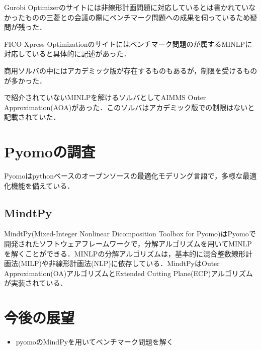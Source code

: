 \documentclass[twocolumn]{jarticle}
\begin{document}
    Gurobi Optimizer\cite{gurobi}のサイトには非線形計画問題に対応しているとは書かれていなかったものの三菱との会議の際にベンチマーク問題への成果を伺っているため疑問が残った．

    FICO Xpress Optimization\cite{fico}のサイトにはベンチマーク問題のが属するMINLPに対応していると具体的に記述があった．

    商用ソルバの中にはアカデミック版が存在するものもあるが，制限を受けるものが多かった．
    
    \cite{40021875158}で紹介されていないMINLPを解けるソルバとしてAIMMS Outer Approximation(AOA)\cite{AOA}があった．このソルバはアカデミック版での制限はないと記載されていた．

\section{Pyomoの調査}
    Pyomo\cite{bynum2021pyomo}\cite{hart2011pyomo}はpythonベースのオープンソースの最適化モデリング言語で，多様な最適化機能を備えている．
    \subsection{MindtPy}
        MindtPy(Mixed-Integer Nonlinear Dicomposition Toolbox for Pyomo)\cite{BERNAL2018895}はPyomoで開発されたソフトウェアフレームワークで，分解アルゴリズムを用いてMINLPを解くことができる．MINLPの分解アルゴリズムは，基本的に混合整数線形計画法(MILP)や非線形計画法(NLP)に依存している．MindtPyはOuter Approximation(OA)アルゴリズム\cite{10.5555/2990007.2990122}とExtended Cutting Plane(ECP)アルゴリズム\cite{WESTERLUND1995131}が実装されている．

\section{今後の展望}
    \begin{itemize}
        \item pyomoのMindPyを用いてベンチマーク問題を解く
    \end{itemize}

\end{document}
